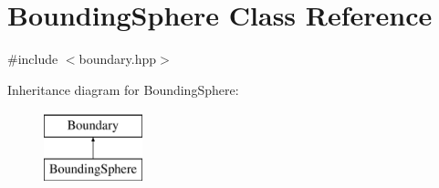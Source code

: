 \hypertarget{class_bounding_sphere}{}\section{Bounding\+Sphere Class Reference}
\label{class_bounding_sphere}


{\ttfamily \#include $<$boundary.\+hpp$>$}

Inheritance diagram for Bounding\+Sphere\+:\begin{figure}[H]
\begin{center}
\leavevmode
\includegraphics[height=2.000000cm]{class_bounding_sphere}
\end{center}
\end{figure}
